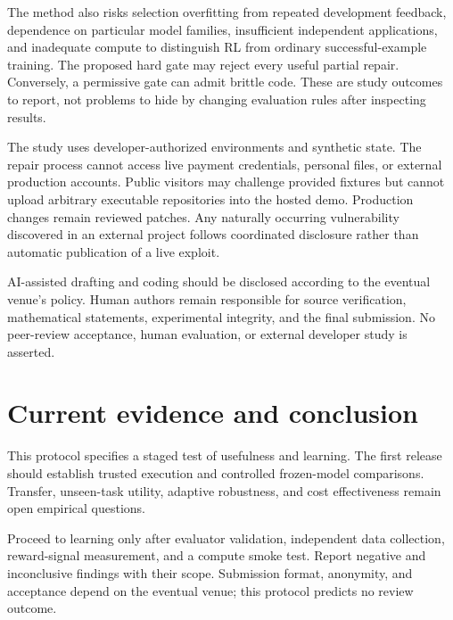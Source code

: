 \documentclass[11pt,a4paper]{article}
\begin{document}
The method also risks selection overfitting from repeated development feedback, dependence on particular model families, insufficient independent applications, and inadequate compute to distinguish RL from ordinary successful-example training. The proposed hard gate may reject every useful partial repair. Conversely, a permissive gate can admit brittle code. These are study outcomes to report, not problems to hide by changing evaluation rules after inspecting results.

The study uses developer-authorized environments and synthetic state. The repair process cannot access live payment credentials, personal files, or external production accounts. Public visitors may challenge provided fixtures but cannot upload arbitrary executable repositories into the hosted demo. Production changes remain reviewed patches. Any naturally occurring vulnerability discovered in an external project follows coordinated disclosure rather than automatic publication of a live exploit.

AI-assisted drafting and coding should be disclosed according to the eventual venue's policy. Human authors remain responsible for source verification, mathematical statements, experimental integrity, and the final submission. No peer-review acceptance, human evaluation, or external developer study is asserted.

\section{Current evidence and conclusion}
This protocol specifies a staged test of usefulness and learning. The first release should establish trusted execution and controlled frozen-model comparisons. Transfer, unseen-task utility, adaptive robustness, and cost effectiveness remain open empirical questions.

Proceed to learning only after evaluator validation, independent data collection, reward-signal measurement, and a compute smoke test. Report negative and inconclusive findings with their scope. Submission format, anonymity, and acceptance depend on the eventual venue; this protocol predicts no review outcome.
\end{document}
